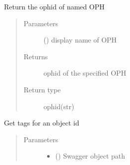 \documentclass[letterpaper,10pt,english]{sphinxmanual}
\begin{document}
\begin{fulllineitems}
\begin{fulllineitems}
\begin{quote}
\begin{description}
\end{description}\end{quote}

\end{fulllineitems}


\begin{fulllineitems}
\label{\detokenize{b1oph-class:bloxone.b1oph.get_ophid}}
\sphinxAtStartPar
Return the ophid of named OPH
\begin{quote}\begin{description}
\item[{Parameters}] \leavevmode
\sphinxAtStartPar
{} () \textendash{} display name of OPH

\item[{Returns}] \leavevmode
\sphinxAtStartPar
ophid of the specified OPH

\item[{Return type}] \leavevmode
\sphinxAtStartPar
ophid(str)

\end{description}\end{quote}

\end{fulllineitems}


\begin{fulllineitems}
\label{\detokenize{b1oph-class:bloxone.b1oph.get_tags}}
\sphinxAtStartPar
Get tags for an object id
\begin{quote}\begin{description}
\item[{Parameters}] \leavevmode\begin{itemize}
\item {} 
\sphinxAtStartPar
{} () \textendash{} Swagger object path


\end{itemize}
\end{description}
\end{quote}
\end{fulllineitems}
\end{fulllineitems}
\end{document}
